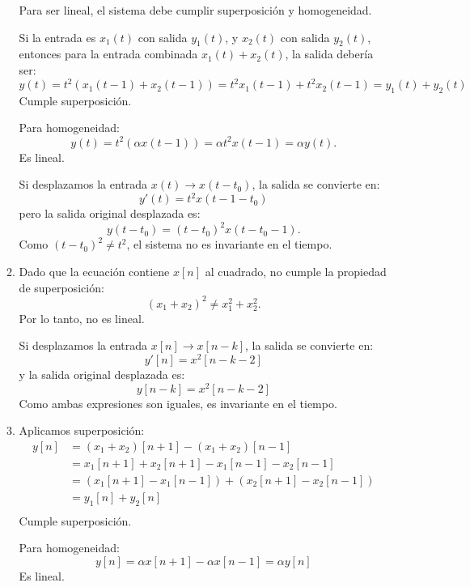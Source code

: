 \begin{enumerate}[label=\color{red}\textbf{\arabic*)}]
\begin{enumerate}[label=\color{red}\textbf{\alph*)}]
            Para ser lineal, el sistema debe cumplir superposición y homogeneidad.

            Si la entrada es $x_1(t)$ con salida $y_1(t)$, y $x_2(t)$ con salida $y_2(t)$, entonces para la entrada combinada $x_1(t)+x_2(t)$, la salida debería ser: \[
            y(t)=t^2(x_1(t-1)+x_2(t-1))=t^2x_1(t-1)+t^2x_2(t-1)=y_1(t)+y_2(t)
            \] 
            Cumple superposición.

            Para homogeneidad: \[
            y(t)=t^2(\alpha x(t-1))=\alpha t^2x(t-1)=\alpha y(t).
            \] 
            Es lineal.

            Si desplazamos la entrada $x(t)\to x(t-t_0)$, la salida se convierte en: \[
            y'(t)=t^2x(t-1-t_0)
            \] pero la salida original desplazada es: \[
            y(t-t_0)=(t-t_0)^2x(t-t_0-1).
            \] 
            Como $(t-t_0)^2\neq t^2$, el sistema no es invariante en el tiempo.
        \item  {} 

            Dado que la ecuación contiene $x[n]$ al cuadrado, no cumple la propiedad de superposición:  \[
                (x_1+x_2)^2\neq x_1^2+x_2^2.
            \] 
            Por lo tanto, no es lineal.

            Si desplazamos la entrada $x[n]\to x[n-k]$, la salida se convierte en: \[
                y'[n]=x^2[n-k-2]
            \] y la salida original desplazada es: \[
            y[n-k]=x^2[n-k-2]
            \] 
            Como ambas expresiones son iguales, es invariante en el tiempo.
        \item {} 

            Aplicamos superposición: \[
            \begin{aligned}
                y[n]&= (x_1+x_2)[n+1]-(x_1+x_2)[n-1] \\
                    &= x_1[n+1]+x_2[n+1]-x_1[n-1]-x_2[n-1] \\
                    &= (x_1[n+1]-x_1[n-1])+(x_2[n+1]-x_2[n-1]) \\
                    &= y_1[n]+y_2[n] \\
            \end{aligned}
            \] 
            Cumple superposición.

            Para homogeneidad: \[
                y[n]=\alpha x[n+1]-\alpha x[n-1]=\alpha y[n]
            \] 
            Es lineal.


\end{enumerate}
\end{enumerate}
